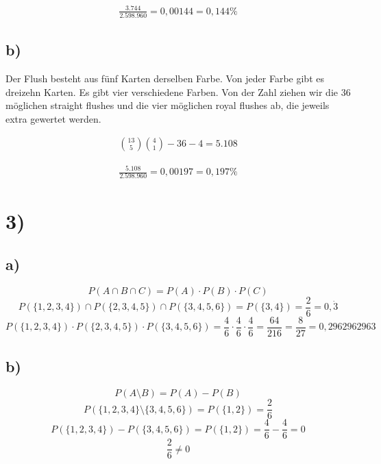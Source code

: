 \documentclass{article}
\begin{document}
  \begin{align*}
    \frac{3.744}{2.598.960} = 0,00144 = 0,144\%
  \end{align*}


  \subsection*{b)}
  Der Flush besteht aus fünf Karten derselben Farbe. Von jeder Farbe gibt es dreizehn Karten. Es gibt vier verschiedene Farben. Von der Zahl ziehen wir die 36 möglichen straight flushes und die vier möglichen royal flushes ab, die jeweils extra gewertet werden.

  \begin{align*}
    \binom{13}{5}\binom{4}{1} - 36 - 4 = 5.108
  \end{align*}

  \begin{align*}
    \frac{5.108}{2.598.960} = 0,00197 = 0,197\%
  \end{align*}

\section*{3)}

  \subsection*{a)}
    \[ P(A \cap B \cap C) = P(A) \cdot P(B) \cdot P(C) \]
    \[ P(\{1, 2, 3, 4\}) \cap P(\{2, 3, 4, 5\}) \cap P(\{3, 4, 5, 6\}) = P(\{3, 4\}) = \frac{2}{6} = 0,\dot{3} \]
    \[ P(\{1, 2, 3, 4\}) \cdot P(\{2, 3, 4, 5\}) \cdot P(\{3, 4, 5, 6\}) = \frac{4}{6} \cdot \frac{4}{6} \cdot \frac{4}{6} = \frac{64}{216} = \frac{8}{27} = 0,2962962963 \]

  \subsection*{b)}
    \[ P(A \setminus B) = P(A) - P(B) \]
    \[ P(\{1, 2, 3, 4\} \setminus \{3, 4, 5, 6\}) = P(\{1, 2\}) = \frac{2}{6} \]
    \[ P(\{1, 2, 3, 4\}) - P(\{3, 4, 5, 6\}) = P(\{1, 2\}) = \frac{4}{6} - \frac{4}{6} = 0 \]
    \[ \frac{2}{6} \neq 0 \]
\end{document}
